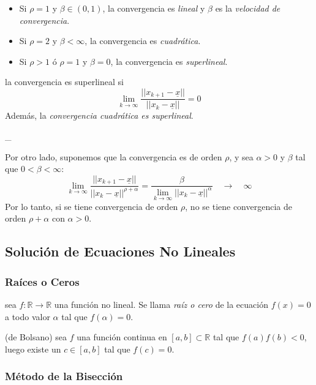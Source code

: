 \begin{itemize}
\tightlist
\item
  Si \(\rho = 1\) y \(\beta \in (0,1)\), la convergencia es
  \emph{lineal} y \(\beta\) es la \emph{velocidad de convergencia}.
\item
  Si \(\rho = 2\) y \(\beta < \infty\), la convergencia es
  \emph{cuadrática}.
\item
  Si \(\rho > 1\) ó \(\rho = 1\) y \(\beta = 0\), la convergencia es
  \emph{superlineal}.
\end{itemize}

\Definicion la convergencia es superlineal si \[
\ensuremath{\lim_{k \to \infty} \frac{|| x_{k+1} - \underline{x} ||}{||x_k - \underline{x}||}} = 0
\] Además, la \emph{convergencia cuadrática es superlineal}.

\_

Por otro lado, suponemos que la convergencia es de orden \(\rho\), y sea
\(\alpha > 0\) y \(\beta\) tal que \(0 < \beta < \infty\): \[
\ensuremath{\lim_{k \to \infty} \frac{|| x_{k+1} - \underline{x} ||}{||x_k - \underline{x}||^{\rho+\alpha}}}
= \frac{\beta}{\ensuremath{\lim_{k \to \infty} || x_k - \underline{x} ||^{\alpha}}}
\quad \longrightarrow \quad \infty
\] Por lo tanto, si se tiene convergencia de orden \(\rho\), no se tiene
convergencia de orden \(\rho+\alpha\) con \(\alpha>0\).

\hypertarget{soluciuxf3n-de-ecuaciones-no-lineales-1}{%
\subsection{Solución de Ecuaciones No
Lineales}\label{soluciuxf3n-de-ecuaciones-no-lineales-1}}

\hypertarget{rauxedces-o-ceros}{%
\subsubsection{Raíces o Ceros}\label{rauxedces-o-ceros}}

\Definicion sea
\(f : \ensuremath{\mathbb{R}}\rightarrow \ensuremath{\mathbb{R}}\) una
función no lineal. Se llama \emph{raíz o cero} de la ecuación
\(f(x) = 0\) a todo valor \(\alpha\) tal que \(f(\alpha) = 0\).

\Teorema (de Bolsano) sea \(f\) una función continua en
\([a,b] \subset \ensuremath{\mathbb{R}}\) tal que \(f(a)f(b) < 0\),
luego existe un \(c \in [a,b]\) tal que \(f(c) = 0\).

\hypertarget{muxe9todo-de-la-bisecciuxf3n}{%
\subsubsection{Método de la
Bisección}\label{muxe9todo-de-la-bisecciuxf3n}}

